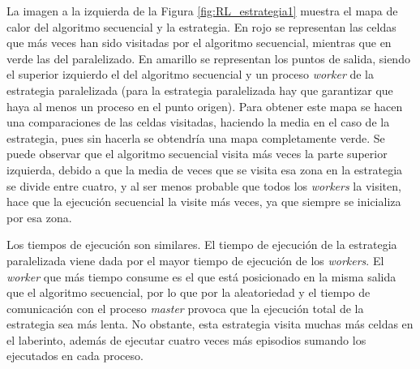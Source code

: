 		La imagen a la izquierda de la Figura \ref{fig:RL_estrategia1} muestra el mapa de calor del algoritmo secuencial y la estrategia. En rojo se representan las celdas que más veces han sido visitadas por el algoritmo secuencial, mientras que en verde las del paralelizado. En amarillo se representan los puntos de salida, siendo el superior izquierdo el del algoritmo secuencial y un proceso \textit{worker} de la estrategia paralelizada (para la estrategia paralelizada hay que garantizar que haya al menos un proceso en el punto origen). Para obtener este mapa se hacen una comparaciones de las celdas visitadas, haciendo la media en el caso de la estrategia, pues sin hacerla se obtendría una mapa completamente verde. Se puede observar que el algoritmo secuencial visita más veces la parte superior izquierda, debido a que la media de veces que se visita esa zona en la estrategia se divide entre cuatro, y al ser menos probable que todos los \textit{workers} la visiten, hace que la ejecución secuencial la visite más veces, ya que siempre se inicializa por esa zona. 
		
		Los tiempos de ejecución son similares. El tiempo de ejecución de la estrategia paralelizada viene dada por el mayor tiempo de ejecución de los \textit{workers}. El \textit{worker} que más tiempo consume es el que está posicionado en la misma salida que el algoritmo secuencial, por lo que por la aleatoriedad y el tiempo de comunicación con el proceso \textit{master} provoca que la ejecución total de la estrategia sea más lenta. No obstante, esta estrategia visita muchas más celdas en el laberinto, además de ejecutar cuatro veces más episodios sumando los ejecutados en cada proceso.		
		
